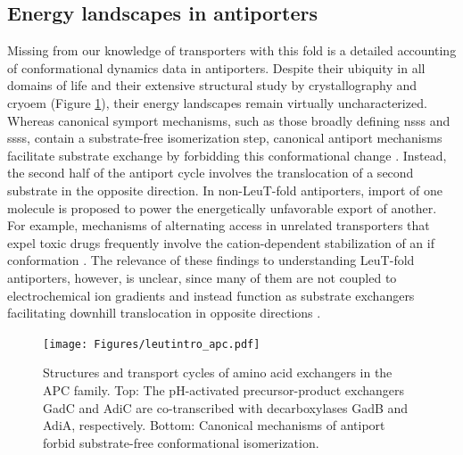 \subsection{Energy landscapes in antiporters}\label{sec:leutintro_antiporters}

Missing from our knowledge of transporters with this fold is a detailed accounting of conformational dynamics data in antiporters. Despite their ubiquity in all domains of life and their extensive structural study by crystallography and \gls{cryoem} (Figure \ref{fig:leutintro_apc}), their energy landscapes remain virtually uncharacterized. Whereas canonical symport mechanisms, such as those broadly defining \gls{nss}s and \gls{sss}s, contain a substrate-free isomerization step, canonical antiport mechanisms facilitate substrate exchange by forbidding this conformational change \citep*{Forrest2009}. Instead, the second half of the antiport cycle involves the translocation of a second substrate in the opposite direction. In non-LeuT-fold antiporters, import of one molecule is proposed to power the energetically unfavorable export of another. For example, mechanisms of alternating access in unrelated transporters that expel toxic drugs frequently involve the cation-dependent stabilization of an \gls{if} conformation \citep*{Eisinger2017, Jagessar2020, Masureel2014}. The relevance of these findings to understanding LeuT-fold antiporters, however, is unclear, since many of them are not coupled to electrochemical ion gradients and instead function as substrate exchangers facilitating downhill translocation in opposite directions \citep*{Fang2009, Ma2012, Schulze2010, Tang2010}.

\begin{figure}[H]
\centering
\texttt{[image: Figures/leutintro\_apc.pdf]}
 \caption[Structures and transport cycles of amino acid exchangers in the APC family.]{Structures and transport cycles of amino acid exchangers in the APC family. Top: The pH-activated precursor-product exchangers GadC and AdiC are co-transcribed with decarboxylases GadB and AdiA, respectively. Bottom: Canonical mechanisms of antiport forbid substrate-free conformational isomerization.}
\label{fig:leutintro_apc}
\end{figure}

